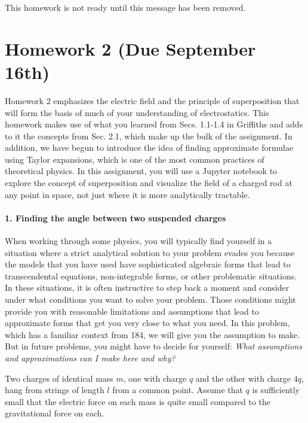 \documentclass[11pt]{article}
\begin{document}
This homework is not ready until this message has been removed.

\section{Homework 2 (Due September
16th)}\label{homework-2-due-september-16th}

Homework 2 emphasizes the electric field and the principle of
superposition that will form the basis of much of your understanding of
electrostatics. This homework makes use of what you learned from Secs.
1.1-1.4 in Griffiths and adds to it the concepts from Sec. 2.1, which
make up the bulk of the assignment. In addition, we have begun to
introduce the idea of finding approximate formulae using Taylor
expansions, which is one of the most common practices of theoretical
physics. In this assignment, you will use a Jupyter notebook to explore
the concept of superposition and visualize the field of a charged rod at
any point in space, not just where it is more analytically tractable.

\paragraph{1. Finding the angle between two suspended
charges}\label{finding-the-angle-between-two-suspended-charges}

When working through some physics, you will typically find yourself in a
situation where a strict analytical solution to your problem evades you
because the models that you have used have sophisticated algebraic forms
that lead to transcendental equations, non-integrable forms, or other
problematic situations. In these situations, it is often instructive to
step back a moment and consider under what conditions you want to solve
your problem. Those conditions might provide you with reasonable
limitations and assumptions that lead to approximate forms that get you
very close to what you need. In this problem, which has a familiar
context from 184, we will give you the assumption to make. But in future
problems, you might have to decide for yourself: \emph{What assumptions
and approximations can I make here and why?}

Two charges of identical mass \(m\), one with charge \(q\) and the other
with charge \(4q\), hang from strings of length \(l\) from a common
point. Assume that \(q\) is sufficiently small that the electric force
on each mass is quite small compared to the gravitational force on each.
\end{document}

